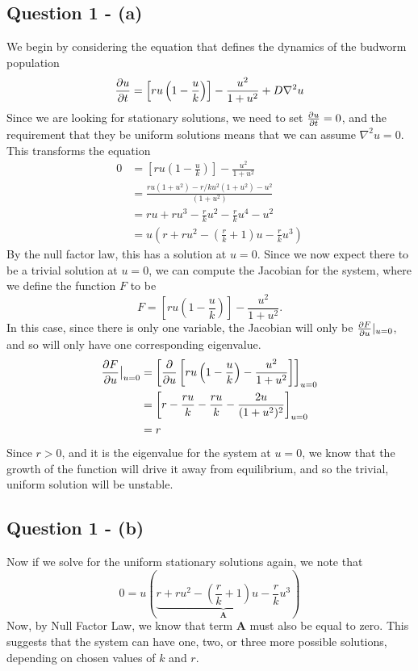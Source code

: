 \documentclass[11pt,a4paper]{article}
\begin{document}
\subsection{Question 1 - (a)}
\label{sec:question1:subsec:parta}
We begin by considering the equation that defines the dynamics of the budworm population
\begin{equation}\label{eq:dynamics}
\pdv{u}{t} = \left[ ru \left( 1 - \frac{u}{k} \right) \right] - \frac{u^2}{1+u^2} + D \nabla^2 u
\end{equation}
Since we are looking for stationary solutions, we need to set $\pdv{u}{t} = 0$, and the requirement that they be uniform solutions means that we can assume $\nabla^2 u = 0$. This transforms the equation
\begin{align*}
0 &= \left[ r u \left( 1 - \frac{u}{k} \right) \right] - \frac{u^2}{1 + u^2} \\
&= \frac{r u (1 + u^2) - r/k u^2 (1+u^2) - u^2 }{(1+u^2) } \\
&= r u + r u^3 - \frac{r}{k} u^2 - \frac{r}{k} u^4 - u^2 \\
&= u \left( r + r u^2 - \left( \frac{r}{k} + 1 \right) u  - \frac{r}{k} u^3 \right) 
\end{align*}
By the null factor law, this has a solution at $u=0$. Since we now expect there to be a trivial solution at $u=0$, we can compute the Jacobian for the system, where we define the function $F$ to be
$$ F =  \left[ r u \left( 1 - \frac{u}{k} \right) \right] - \frac{u^2}{1 + u^2}.$$
In this case, since there is only one variable, the Jacobian will only be $\pdv{F}{u}\rvert_{u=0}$, and so will only have one corresponding eigenvalue. 
\begin{align*}
\pdv{F}{u}\big\rvert_{u=0} &= \left[ \pdv{u} \left[ r u \left(1 - \frac{u}{k} \right) - \frac{u^2}{1+u^2} \right] \right]_{u=0} \\
&= \left[r - \frac{r u}{k} - \frac{r u}{k} - \frac{2 u}{(1+u^2)^2}\right]_{u=0} \\
&= r 
\end{align*}
Since $r >0 $, and it is the eigenvalue for the system at $u=0$,  we know that the growth of the function will drive it away from equilibrium, and so the trivial, uniform solution will be unstable.
\subsection{Question 1 - (b)}
\label{sec:question1:subsec:partb}
Now if we solve for the uniform stationary solutions again, we note that 
$$ 0 = u \left(\underbrace{ r + r u^2 - \left( \frac{r}{k} + 1 \right) u  - \frac{r}{k} u^3 }_{\textbf{A}}   \right)$$
Now, by Null Factor Law, we know that term \textbf{A} must also be equal to zero. This suggests that the system can have one, two, or three more possible solutions, depending on chosen values of $k$ and $r$. 
\end{document}
